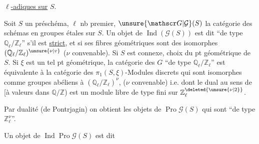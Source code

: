 \uline{ $\ell$-adiques sur} $S$.

Soit $S$ un préschéma, $\ell$ nb premier,   $\unsure{\mathscr G|\mathcal G}(S)$ la catégorie des schémas en groupes  étales sur $S$. Un objet de $\operatorname{Ind}(\mathscr G(S))$ est dit ``de type $\mathbb Q_\ell/\mathbb Z_\ell$'' s'il est \uline{strict}, et si ses fibres géométriques sont des  isomorphes  $(\mathbb Q_\ell/\mathbb Z_\ell)^{\unsure{\nu|v}}$ ($\nu$ convenable). Si $S$ est connexe,   choix du pt géométrique de $S$. Si $\xi$ est un tel pt géométrique, la  catégorie des  $G$ ``de type $\mathbb Q_\ell/\mathbb Z_\ell$'' est  équivalente à la catégorie des \deleted{\unsure{$\xi$}} $\pi_1(S,\xi)$-Modules discrets qui sont isomorphes comme groupes abéliens à $(\mathbb Q_\ell/\mathbb Z_\ell)^\nu$,  ($\nu$ convenable) i.e. dont le dual au sens de  [à valeurs dans $\mathbb Q/\mathbb Z$) est  un module libre de type fini sur $\mathbb Z_\ell^{\deleted{\unsure{\nu|2}}}$.

Par dualité (de Pontrjagin) on obtient les objets de $\operatorname{Pro}\mathscr G(S)$ qui sont ``de type $\mathbb Z_\ell^\nu$''.

Un objet de $\operatorname{Ind}\operatorname{Pro}\mathscr G(S)$ est dit
